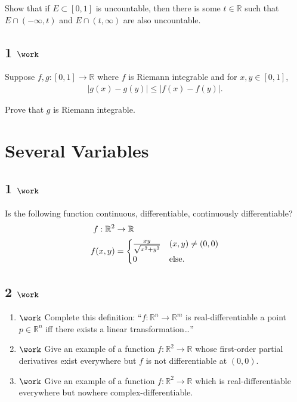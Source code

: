 Show that if \(E\subset [0, 1]\) is uncountable, then there is some
\(t\in {\mathbb{R}}\) such that \(E\cap(-\infty ,t)\) and
\(E\cap(t, \infty)\) are also uncountable.

\hypertarget{work-9}{%
\subsection{\texorpdfstring{1
\(\work\)}{1 \textbackslash work}}\label{work-9}}

Suppose \(f, g: [0, 1] \to {\mathbb{R}}\) where \(f\) is Riemann
integrable and for \(x, y\in [0, 1]\),
\begin{align*}
{\left\lvert {g(x) - g(y)} \right\rvert} \leq {\left\lvert {f(x) - f(y)} \right\rvert}
.\end{align*}

Prove that \(g\) is Riemann integrable.

\hypertarget{several-variables}{%
\section{Several Variables}\label{several-variables}}

\hypertarget{work-10}{%
\subsection{\texorpdfstring{1
\(\work\)}{1 \textbackslash work}}\label{work-10}}

Is the following function continuous, differentiable, continuously
differentiable?
\begin{align*}  
f: {\mathbb{R}}^2 &\to {\mathbb{R}}\\
f(x, y) &= 
\begin{cases}
{xy \over \sqrt{x^2 + y^2}} & (x, y) \neq (0, 0) \\
0 & \text{else}.
\end{cases}
\end{align*}

\hypertarget{work-11}{%
\subsection{\texorpdfstring{2
\(\work\)}{2 \textbackslash work}}\label{work-11}}

\begin{enumerate}
\def\labelenumi{\alph{enumi}.}
\item
  \(\work\) Complete this definition:
  ``\(f: {\mathbb{R}}^n\to {\mathbb{R}}^m\) is real-differentiable a
  point \(p\in {\mathbb{R}}^n\) iff there exists a linear
  transformation\ldots{}''
\item
  \(\work\) Give an example of a function
  \(f:{\mathbb{R}}^2\to {\mathbb{R}}\) whose first-order partial
  derivatives exist everywhere but \(f\) is not differentiable at
  \((0, 0)\).
\item
  \(\work\) Give an example of a function
  \(f: {\mathbb{R}}^2 \to {\mathbb{R}}\) which is real-differentiable
  everywhere but nowhere complex-differentiable.
\end{enumerate}

